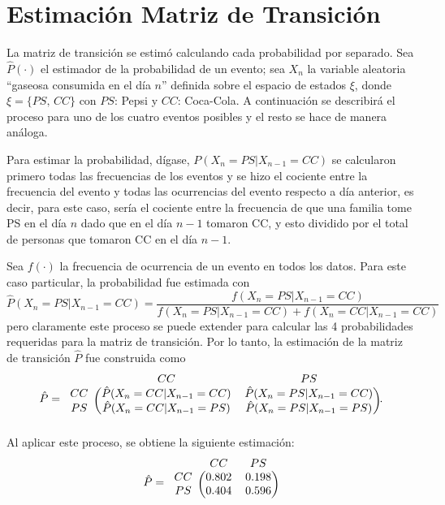 \maketitle
\section{Estimación Matriz de Transición}
La matriz de transición se estimó calculando cada probabilidad por separado. Sea $\hat{P}(\cdot)$ el estimador de la probabilidad de un evento; sea $X_n$ la variable aleatoria ``gaseosa consumida en el día $n$'' definida sobre el espacio de estados $\xi$, donde $\xi=\{PS,\,CC\}$ con $PS$: Pepsi y $CC$: Coca-Cola. A continuación se describirá el proceso para uno de los cuatro eventos posibles y el resto se hace de manera análoga.

Para estimar la probabilidad, dígase, $P(X_n=PS|X_{n-1}=CC)$ se calcularon primero todas las frecuencias de los eventos y se hizo el cociente entre la frecuencia del evento y todas las ocurrencias del evento respecto a día anterior, es decir, para este caso, sería el cociente entre la frecuencia de que una familia tome PS en el día $n$ dado que en el día $n-1$ tomaron CC, y esto dividido por el total de personas que tomaron CC en el día $n-1$.

Sea $f(\cdot)$ la frecuencia de ocurrencia de un evento en todos los datos. Para este caso particular, la probabilidad fue estimada con
\[
\hat{P}(X_n=PS|X_{n-1}=CC)=\dfrac{f(X_n=PS|X_{n-1}=CC)}{f(X_n=PS|X_{n-1}=CC)+f(X_n=CC|X_{n-1}=CC)}
\]
pero claramente este proceso se puede extender para calcular las 4 probabilidades requeridas para la matriz de transición. Por lo tanto, la estimación de la matriz de transición $\hat{P}$ fue construida como
\[
\hat{P}=\begin{blockarray}{ccc}
& CC & PS \\
\begin{block}{c(cc)}
  CC & \hat{P}(X_n=CC|X_{n-1}=CC) & \hat{P}(X_n=PS|X_{n-1}=CC) \\
  PS & \hat{P}(X_n=CC|X_{n-1}=PS) & \hat{P}(X_n=PS|X_{n-1}=PS) \\
\end{block}
\end{blockarray}.
\]
Al aplicar este proceso, se obtiene la siguiente estimación:
\[
\hat{P}=\begin{blockarray}{ccc}
& CC & PS \\
\begin{block}{c(cc)}
  CC & 0.802 & 0.198 \\
  PS & 0.404 & 0.596 \\
\end{block}
\end{blockarray}
\]
